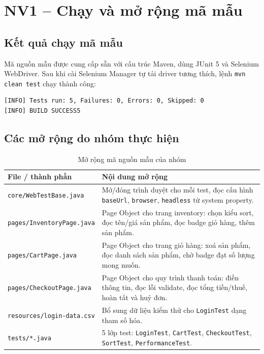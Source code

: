 \documentclass[12pt,a4paper]{article}
\newcommand{\tablestyle}{\small\renewcommand{\arraystretch}{1.25}}
\newcommand{\hrow}{\rowcolor{tablehead}}
\begin{document}
\section{NV1 -- Chạy và mở rộng mã mẫu}

\subsection{Kết quả chạy mã mẫu}
Mã nguồn mẫu được cung cấp sẵn với cấu trúc Maven, dùng JUnit 5 và Selenium WebDriver.
Sau khi cài Selenium Manager tự tải driver tương thích, lệnh \texttt{mvn clean test} chạy thành công:

\begin{verbatim}
[INFO] Tests run: 5, Failures: 0, Errors: 0, Skipped: 0
[INFO] BUILD SUCCESS5
\end{verbatim}

\subsection{Các mở rộng do nhóm thực hiện}
\begin{table}[H]
\centering
\tablestyle
\caption{Mở rộng mã nguồn mẫu của nhóm}
\label{tab:extend}
\begin{tabularx}{\textwidth}{L{5.6cm}Y}
\toprule
\hrow \textbf{File / thành phần} & \textbf{Nội dung mở rộng} \\
\midrule
\texttt{core/WebTestBase.java} & Mở/đóng trình duyệt cho mỗi test, đọc cấu hình \texttt{baseUrl}, \texttt{browser}, \texttt{headless} từ system property. \\
\texttt{pages/InventoryPage.java} & Page Object cho trang inventory: chọn kiểu sort, đọc tên/giá sản phẩm, đọc badge giỏ hàng, thêm sản phẩm. \\
\texttt{pages/CartPage.java} & Page Object cho trang giỏ hàng: xoá sản phẩm, đọc danh sách sản phẩm, chờ badge đạt số lượng mong muốn. \\
\texttt{pages/CheckoutPage.java} & Page Object cho quy trình thanh toán: điền thông tin, đọc lỗi validate, đọc tổng tiền/thuế, hoàn tất và huỷ đơn. \\
\texttt{resources/login-data.csv} & Bổ sung dữ liệu kiểm thử cho \texttt{LoginTest} dạng tham số hóa. \\
\texttt{tests/*.java} & 5 lớp test: \texttt{LoginTest}, \texttt{CartTest}, \texttt{CheckoutTest}, \texttt{SortTest}, \texttt{PerformanceTest}. \\
\bottomrule
\end{tabularx}
\end{table}
\end{document}

